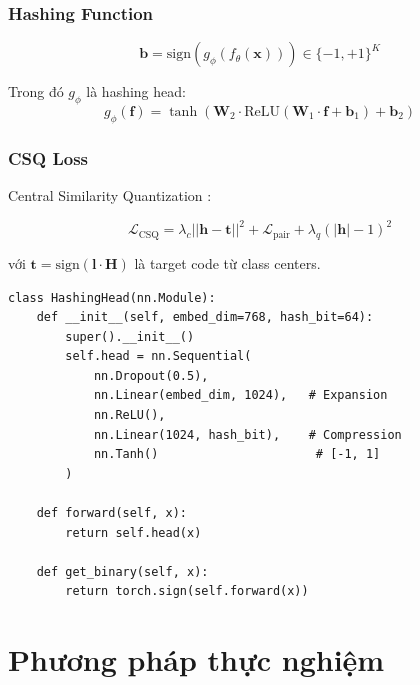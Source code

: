 \documentclass[12pt,a4paper]{article}
\begin{document}
\subsubsection{Hashing Function}

\begin{equation}
    \mathbf{b} = \text{sign}(g_\phi(f_\theta(\mathbf{x}))) \in \{-1, +1\}^K
\end{equation}

Trong đó $g_\phi$ là hashing head:
\begin{equation}
    g_\phi(\mathbf{f}) = \tanh(\mathbf{W}_2 \cdot \text{ReLU}(\mathbf{W}_1 \cdot \mathbf{f} + \mathbf{b}_1) + \mathbf{b}_2)
\end{equation}

\subsubsection{CSQ Loss}

Central Similarity Quantization \cite{yuan2020csq}:

\begin{equation}
    \mathcal{L}_{\text{CSQ}} = \lambda_c ||\mathbf{h} - \mathbf{t}||^2 + \mathcal{L}_{\text{pair}} + \lambda_q (|\mathbf{h}| - 1)^2
\end{equation}

với $\mathbf{t} = \text{sign}(\mathbf{l} \cdot \mathbf{H})$ là target code từ class centers.

\begin{lstlisting}[caption={Hashing Head Architecture}]
class HashingHead(nn.Module):
    def __init__(self, embed_dim=768, hash_bit=64):
        super().__init__()
        self.head = nn.Sequential(
            nn.Dropout(0.5),
            nn.Linear(embed_dim, 1024),   # Expansion
            nn.ReLU(),
            nn.Linear(1024, hash_bit),    # Compression
            nn.Tanh()                      # [-1, 1]
        )
    
    def forward(self, x):
        return self.head(x)
    
    def get_binary(self, x):
        return torch.sign(self.forward(x))
\end{lstlisting}

\section{Phương pháp thực nghiệm}
\end{document}
